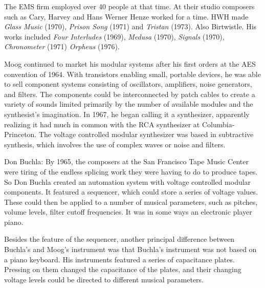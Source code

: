 The EMS firm employed over 40 people at that time. At their studio composers such as Cary, Harvey and Hans Werner Henze worked for a time. HWH made \textit{Glass Music} (1970), \textit{Prison Song} (1971) and \textit{Tristan} (1973). Also Birtwistle.  His works included \textit{Four Interludes} (1969), \textit{Medusa} (1970), \textit{Signals} (1970), \textit{Chronometer} (1971) \textit{Orpheus} (1976). 


Moog continued to market his modular systems after his first orders at the AES convention of 1964. With transistors enabling small, portable devices, he was able to sell component systems consisting of oscillators, amplifiers, noise generators, and filters. The components could be interconnected by patch cables to create a variety of sounds limited primarily by the number of available modules and the synthesist's imagination. In 1967, he began calling it a synthesizer, apparently realizing it had much in common with the RCA synthesizer at Columbia-Princeton. The voltage controlled modular synthesizer was based in subtractive synthesis, which involves the use of complex waves or noise and filters.

Don Buchla: By 1965, the composers at the San Francisco Tape Music Center were tiring of the endless splicing work they were having to do to produce tapes. So Don Buchla created an automation system with voltage controlled modular components. It featured a sequencer, which could store a series of voltage values. These could then be applied to a number of musical parameters, such as pitches, volume levels, filter cutoff frequencies. It was in some ways an electronic player piano.

Besides the feature of the sequencer, another principal difference between Buchla's and Moog's instrument was that Buchla's instrument was not based on a piano keyboard. His instruments featured a series of capacitance plates. Pressing on them changed the capacitance of the plates, and their changing voltage levels could be directed to different musical parameters.

